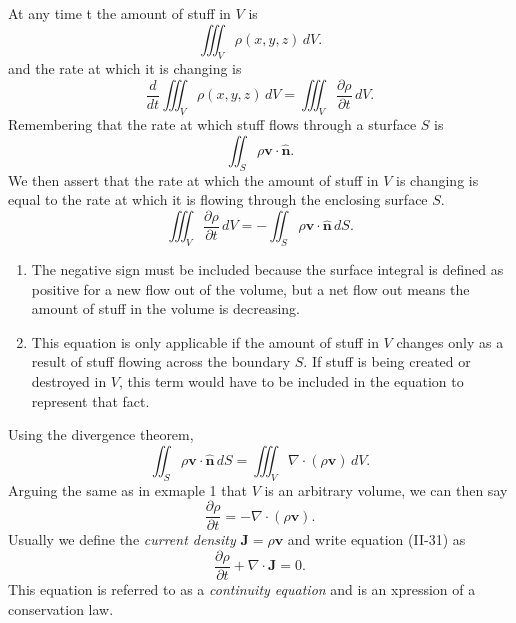 \documentclass[11pt]{article}
\begin{document}
At any time t the amount of stuff in $V$ is
\[
\iiint_V \rho(x,y,z) \, dV
.\]
and the rate at which it is changing is
\[
\frac{d}{dt}\iiint_V \rho(x,y,z) \, dV = \iiint_V \frac{\partial \rho}{\partial t} \, dV
.\]
Remembering that the rate at which stuff flows through a sturface $S$ is
\[
	\iint_S \rho \mathbf{v} \cdot \mathbf{\hat{n}}
.\]
We then assert that the rate at which the amount of stuff in $V$ is changing is equal to the rate at which it is flowing through the enclosing surface $S$.
\[
	\iiint_V \frac{\partial \rho}{\partial t} \, dV = -\iint_S \rho \mathbf{v} \cdot \mathbf{\hat{n}} \, dS
.\]
\begin{enumerate}
	\item The negative sign must be included because the surface integral is defined as positive for a new flow out of the volume, but a net flow out means the amount of stuff in the volume is decreasing.
	\item This equation is only applicable if the amount of stuff in $V$ changes only as a result of stuff flowing across the boundary $S$. If stuff is being created or destroyed in $V$, this term would have to be included in the equation to represent that fact.
\end{enumerate}
Using the divergence theorem,
\[
	\iint_S \rho \mathbf{v} \cdot \mathbf{\hat{n}} \, dS = \iiint_V \nabla \cdot (\rho \mathbf{v}) \, dV
.\]
Arguing the same as in exmaple 1 that $V$ is an arbitrary volume, we can then say
\[
	\frac{\partial \rho}{\partial t} = -\nabla \cdot (\rho \mathbf{v}) \tag{II-33}
.\]
Usually we define the \textit{current density} $\mathbf{J} = \rho \mathbf{v}$ and write equation (II-31) as
 \[
	\frac{\partial \rho}{\partial t} + \nabla  \cdot \mathbf{J} = 0
.\]
This equation is referred to as a \textit{continuity equation} and is an xpression of a conservation law.
\end{document}
